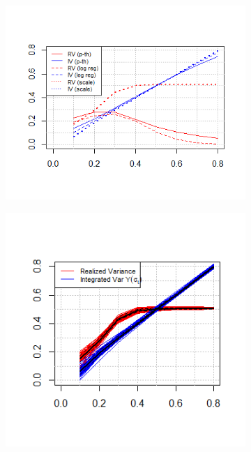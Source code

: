 \documentclass{article}
\begin{document}
\begin{figure}[htbp]
    \centering
    
    \begin{subfigure}{0.48\textwidth}
        \includegraphics[width=\linewidth]{ex7_single_all.png}
    \end{subfigure}
    \hfill
    \begin{subfigure}{0.48\textwidth}
        \includegraphics[width=\linewidth]{ex7_final100scale.png}
    \end{subfigure}
    

\end{figure}
\end{document}
